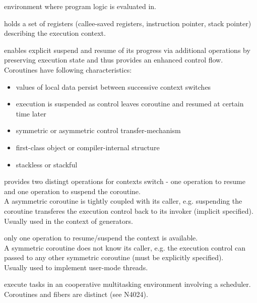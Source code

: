 
environment where program logic is evaluated in.

holds a set of registers (callee-saved registers, instruction pointer, stack
pointer) describing the execution context.

enables explicit suspend and resume of its progress via additional operations by
preserving execution state and thus provides an enhanced control flow.\\
Coroutines have following characteristics\cite{N3985}:
\begin{itemize}
    \item values of local data persist between successive context switches
    \item execution is suspended as control leaves coroutine and resumed at
          certain time later
    \item symmetric or asymmetric control transfer-mechanism
    \item first-class object or compiler-internal structure
    \item stackless or stackful
\end{itemize}

provides two distingt operations for contexts switch - one operation to
resume and one operation to suspend the coroutine.\\
A asymmetric coroutine is tightly coupled with its caller, e.g. suspending
the coroutine transferes the execution control back to its invoker (implicit
specified).\\
Usually used in the context of generators.

only one operation to resume/suspend the context is available.\\
A symmetric coroutine does not know its caller, e.g. the execution control can
passed to any other symmetric coroutine (must be explicitly specified).\\
Usually used to implement user-mode threads.

execute tasks in an cooperative multitasking environment involving a
scheduler. Coroutines and fibers are distinct (see N4024\cite{N4024}).

